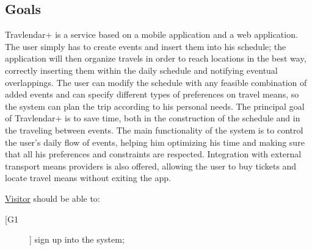 \subsection{Goals}
Travlendar+ is a service based on a mobile application and a web application.
\newline
\newline
The user simply has to create events and insert them into his schedule; the application will then organize travels in order to reach locations in the best way, correctly inserting them within the daily schedule and notifying eventual overlappings. \newline
The user can modify the schedule with any feasible combination of added events and can specify different types of preferences on travel means, so the system can plan the trip according to his personal needs.
\newline
\newline
The principal goal of Travlendar+ is to save time, both in the construction of the schedule and in the traveling between events.
The main functionality of the system is to control the user's daily flow of events, helping him optimizing his time and making sure that all his preferences and constraints are respected.
Integration with external transport means providers is also offered, allowing the user to buy tickets and locate travel means without exiting the app.
\newline
\newline

\underline{Visitor} should be able to:
\begin{description}
\item [[G1]] sign up into the system;
\end{description}

